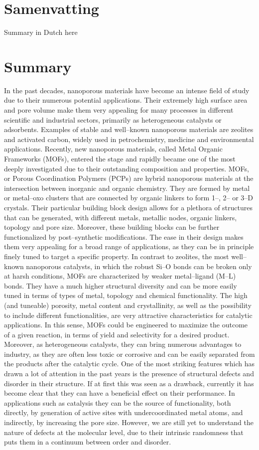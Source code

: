 \chapter{Samenvatting}
Summary in Dutch here

\chapter{Summary}
 In the past decades, nanoporous materials have become an intense field of study due to their numerous potential applications. Their extremely high surface area and pore volume make them very appealing for many processes in different scientific and industrial sectors, primarily as heterogeneous catalysts or adsorbents. Examples of stable and well--known nanoporous materials are zeolites and activated carbon, widely used in petrochemistry, medicine and environmental applications. 
\npar
Recently, new nanoporous materials, called Metal Organic Frameworks (MOFs), entered the stage and rapidly became one of the most deeply investigated due to their outstanding composition and properties. MOFs, or Porous Coordination Polymers (PCPs) are hybrid nanoporous materials at the intersection between inorganic and organic chemistry. They are formed by metal or metal--oxo clusters that are connected by organic linkers to form 1--, 2-- or 3--D crystals. Their particular building block design allows for a plethora of structures that can be generated, with different metals, metallic nodes, organic linkers, topology and pore size. Moreover, these building blocks can be further functionalized by post--synthetic modifications. The ease in their design makes them very appealing for a broad range of applications, as they can be in principle finely tuned to target a specific property. In contrast to zeolites, the most well--known nanoporous catalysts, in which the robust Si--O bonds can be broken only at harsh conditions, MOFs are characterized by weaker metal--ligand (M--L) bonds. They have a much higher structural diversity and can be more easily tuned in terms of types of metal, topology and chemical functionality. The high (and tuneable) porosity, metal content and crystallinity, as well as the possibility to include different functionalities, are very attractive characteristics for catalytic applications. In this sense, MOFs could be engineered to maximize the outcome of a given reaction, in terms of yield and selectivity for a desired product. Moreover, as heterogeneous catalysts, they can bring numerous advantages to industry, as they are often less toxic or corrosive and can be easily separated from the products after the catalytic cycle. One of the most striking features which has drawn a lot of attention in the past years is the presence of structural defects and disorder in their structure. If at first this was seen as a drawback, currently it has become clear that they can have a beneficial effect on their performance. In applications such as catalysis they can be the source of functionality, both directly, by generation of active sites with undercoordinated metal atoms, and indirectly, by increasing the pore size. However, we are still yet to understand the nature of defects at the molecular level, due to their intrinsic randomness that puts them in a continuum between order and disorder.
